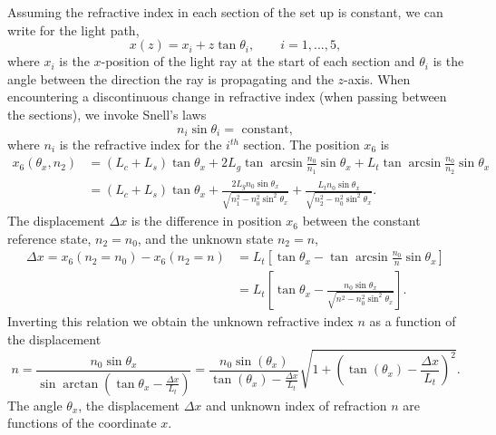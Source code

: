 \documentclass{article}
\begin{document}
Assuming the refractive index in each section of the set up is constant, we can write for the light path,
\begin{equation}
	\label{eq:simpleline}
x(z) = x_i + z \tan \theta_i, \qquad i = 1, ... , 5,
\end{equation}
where $x_i$ is the $x$-position of the light ray at the start of each section and $\theta_i$ is the angle between the direction the ray is propagating and the $z$-axis. When encountering a discontinuous change in refractive index (when passing between the sections), we invoke Snell's laws
\begin{equation}
	\label{eq:snellslaw}
n_i \sin \theta_i = \mbox{ constant},
\end{equation}
where $n_i$ is the refractive index for the $i^{th}$ section. The position $x_6$ is
\begin{align}
\label{eq:simplex6}
x_6 (\theta_x, n_2) & =  (L_c+L_s) \tan \theta_x + 2 L_g \tan \arcsin \frac{n_0}{n_1} \sin \theta_x + L_t \tan \arcsin \frac{n_0}{n_2} \sin \theta_x \nonumber \\
& =  (L_c+L_s) \tan \theta_x + \frac{2 L_g n_0 \sin \theta_x}{\sqrt{n_1^2 - n_0^2 \sin^2 \theta_x}} + \frac{L_t n_0 \sin \theta_x}{\sqrt{n_2^2 - n_0^2 \sin^2 \theta_x}}.
\end{align}
The displacement $\Delta x$ is the difference in position $x_6$ between the constant reference state, $n_2 = n_0$, and the unknown state $n_2=n$, 
\begin{align}
\label{eq:dexcon2}
\Delta x = x_6 (n_2 = n_0) - x_6 (n_2 = n) & = L_t \left[ \tan \theta_x - \tan \arcsin \frac{n_0}{n} \sin \theta_x\right] \nonumber \\
& = L_t \left[ \tan \theta_x - \frac{n_0 \sin \theta_x}{\sqrt{n^2 - n_0^2 \sin^2 \theta_x}} \right] .
\end{align}
Inverting this relation we obtain the unknown refractive index $n$ as a function of the displacement
\begin{equation}
\label{eq:invdexcon2}
n = \frac{n_0 \sin \theta_x}{\sin \arctan \left( \tan \theta_x - \frac{\Delta x}{L_t} \right)} = \frac{n_0 \sin(\theta_x)}{\tan(\theta_x)-\frac{\Delta x}{L_t}} \sqrt{1+\left(\tan(\theta_x)-\frac{\Delta x}{L_t}\right)^2}.
\end{equation}
The angle $\theta_x$, the displacement $\Delta x$ and unknown index of refraction $n$ are functions of the coordinate $x$. %
\end{document}
